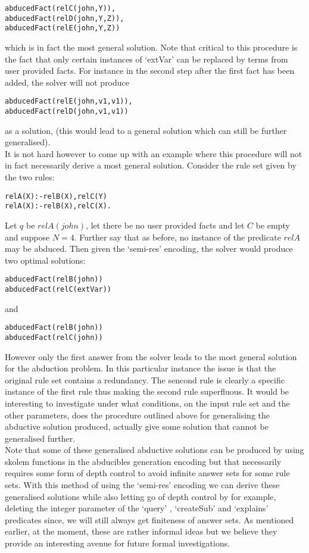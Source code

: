 \begin{lstlisting}[frame = none]
abducedFact(relC(john,Y)), 
abducedFact(relD(john,Y,Z)), 
abducedFact(relE(john,Y,Z)) 
\end{lstlisting}
which is in fact the most general solution. Note that critical to this procedure is the fact that only certain instances of ‘extVar’ can be replaced by terms from user provided facts. For instance in the second step after the first fact has been added, the solver will not produce 
\begin{lstlisting}[frame = none]
abducedFact(relE(john,v1,v1)),
abducedFact(relD(john,v1,v1))
\end{lstlisting}
as a solution, (this would lead to a general solution which can still be further generalised).\\ It is not hard however to come up with an example where this procedure will not in fact necessarily derive a most general solution. Consider the rule set given by the two rules:
\begin{lstlisting}[frame = none]
relA(X):-relB(X),relC(Y)
relA(X):-relB(X),relC(X).
\end{lstlisting}
Let $q$ be $relA(john)$, let there be no user provided facts and let $C$ be empty and suppose $N = 4$. Further say that as before, no instance of the predicate $relA$ may be abduced. Then given the ‘semi-res’ encoding, the solver would produce two optimal solutions:
\begin{lstlisting}[frame = none]
abducedFact(relB(john))
abducedFact(relC(extVar))
\end{lstlisting} and 
\begin{lstlisting}[frame = none]
abducedFact(relB(john))
abducedFact(relC(john))
\end{lstlisting}
However only the first answer from the solver leads to the most general solution for the abduction problem. In this particular instance the issue is that the original rule set contains a redundancy. The sencond rule is clearly a specific instance of the first rule thus making the second rule superfluous. It would be interesting to investigate under what conditions, on the input rule set and the other parameters, does the procedure outlined above for generalising the abductive solution produced, actually give some solution that cannot be generalised further. \\Note that some of these generalised abductive solutions can be produced by using skolem functions in the abducibles generation encoding but that necessarily requires some form of depth control to avoid infinite answer sets for some rule sets. With this method of using the ‘semi-res’ encoding we can derive these generalised solutions while also letting go of depth control by for example, deleting the integer parameter of the  ‘query’ , ‘createSub’ and ‘explains’ predicates since, we will still always get finiteness of answer sets. As mentioned earlier, at the moment, these are rather informal ideas but we believe they provide an interesting avenue for future formal investigations.    






